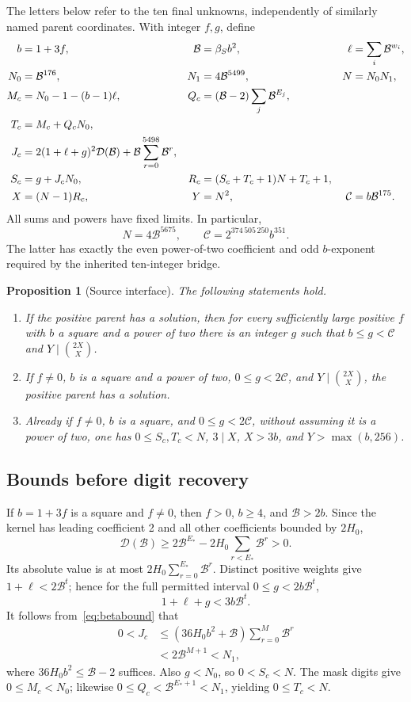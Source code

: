 \documentclass[11pt,letterpaper]{article}
\newtheorem{proposition}[theorem]{Proposition}
\theoremstyle{definition}\newtheorem{definition}[theorem]{Definition}
\newcommand{\BB}{\mathcal B}\newcommand{\Dc}{\mathcal D}\newcommand{\Ccap}{\mathcal C}
\begin{document}
The letters below refer to the ten final unknowns, independently of
similarly named parent coordinates. With integer $f,g$, define
\begin{align}
b&=1+3f,&\BB&=\beta_Sb^2,&\ell&=\sum_i\BB^{w_i},\notag\\
N_0&=\BB^{176},&N_1&=4\BB^{5499},&N&=N_0N_1,\notag\\
M_c&=N_0-1-(b-1)\ell,&Q_c&=(\BB-2)\sum_j\BB^{E_j},\notag\\
T_c&=M_c+Q_cN_0,&&&\notag\\
J_c&=2(1+\ell+g)^2\Dc(\BB)+\BB\sum_{r=0}^{5498}\BB^r,&&&\notag\\
S_c&=g+J_cN_0,&R_c&=(S_c+T_c+1)N+T_c+1,\notag\\
X&=(N-1)R_c,&Y&=N^2,&\Ccap&=b\BB^{175}.
\label{eq:source}
\end{align}
All sums and powers have fixed limits. In particular,
\[
N=4\BB^{5675},\qquad
\Ccap=2^{374\,505\,250}b^{351}.
\]
The latter has exactly the even power-of-two coefficient and odd
$b$-exponent required by the inherited ten-integer bridge.

\begin{proposition}[Source interface]
\label{prop:source}
The following statements hold.
\begin{enumerate}[label=(\roman*)]
\item If the positive parent has a solution, then for every sufficiently
large positive $f$ with $b$ a square and a power of two there is an integer
$g$ such that $b\le g<\Ccap$ and $Y\mid\binom{2X}{X}$.
\item If $f\ne0$, $b$ is a square and a power of two,
$0\le g<2\Ccap$, and $Y\mid\binom{2X}{X}$, the positive parent has a solution.
\item Already if $f\ne0$, $b$ is a square, and $0\le g<2\Ccap$, without
assuming it is a power of two, one has
$0\le S_c,T_c<N$, $3\mid X$, $X>3b$, and $Y>\max(b,256)$.
\end{enumerate}
\end{proposition}

\subsection{Bounds before digit recovery}
If $b=1+3f$ is a square and $f\ne0$, then $f>0$, $b\ge4$, and
$\BB>2b$. Since the kernel has leading coefficient 2 and all other
coefficients bounded by $2H_0$,
\[
\Dc(\BB)\ge2\BB^{E_*}-2H_0\sum_{r<E_*}\BB^r>0.
\]
Its absolute value is at most $2H_0\sum_{r=0}^{E_*}\BB^r$.
Distinct positive weights give $1+\ell<2\BB^t$; hence for the full
permitted interval $0\le g<2b\BB^t$,
\[
1+\ell+g<3b\BB^t.
\]
It follows from~\eqref{eq:betabound} that
\begin{align*}
0<J_c
&\le(36H_0b^2+\BB)\sum_{r=0}^M\BB^r\\
&<2\BB^{M+1}<N_1,
\end{align*}
where $36H_0b^2\le\BB-2$ suffices. Also $g<N_0$, so $0<S_c<N$.
The mask digits give $0\le M_c<N_0$; likewise
$0\le Q_c<\BB^{E_*+1}<N_1$, yielding $0\le T_c<N$.
\end{document}

